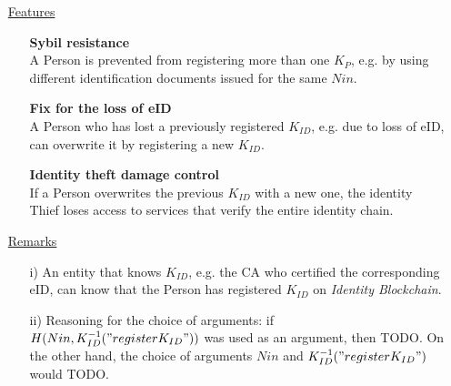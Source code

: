 \documentclass{article}
\newcommand{\khk}{K_{P}}
\newcommand{\kid}{K_{ID}}
\newcommand{\pbc}{\textit{Identity Blockchain}}
\begin{document}
\begin{enumerate}[leftmargin=0cm]
\item[] \underline{Features}
    \begin{itemize}
      \item[] \textbf{Sybil resistance} \\ A Person is prevented from registering more than one $\khk$, e.g. by using different identification documents issued for the same $Nin$.
          \vspace{5px}
      \item[] \textbf{Fix for the loss of eID} \\ A Person who has lost a previously registered $\kid$, e.g. due to loss of eID, can overwrite it by registering a new $\kid$.
          \vspace{5px}
      \item[] \textbf{Identity theft damage control} \\ If a Person overwrites the previous $\kid$ with a new one, the identity Thief loses access to services that verify the entire identity chain.
    \end{itemize}

\item[] \underline{Remarks}
\begin{itemize}
\item[i)] An entity that knows $\kid$, e.g. the CA who certified the corresponding eID, can know that the Person has registered $\kid$ on \pbc{}.
\item[ii)] Reasoning for the choice of arguments: if $H(Nin, \kid^{-1}("register\kid"))$ was used as an argument, then TODO. On the other hand, the choice of arguments $Nin$ and $\kid^{-1}("register\kid")$ would TODO.
\end{itemize}
\end{enumerate}

\newpage
\end{document}
